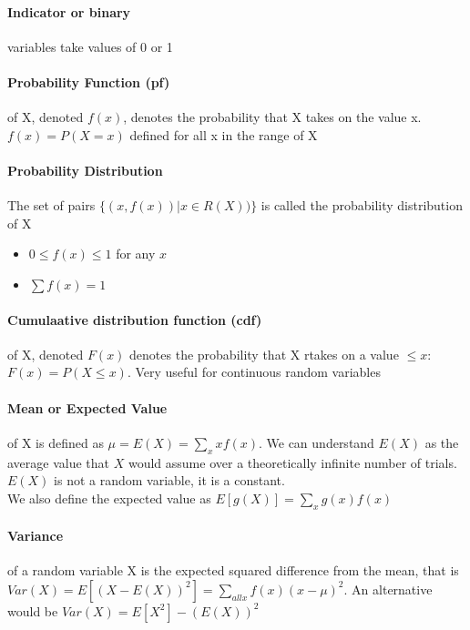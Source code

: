 \documentclass[12pt]{report}
\begin{document}
    \paragraph{Indicator or binary} variables take values of 0 or 1

    \paragraph{Probability Function (pf)} of X, denoted $f(x)$, denotes the
    probability that X takes on the value x. $f(x) = P(X = x)$ defined for all
    x in the range of X

    \paragraph{Probability Distribution} The set of pairs $\{(x, f(x)) | x \in
    R(X))\}$ is called the probability distribution of X
    \begin{itemize}
      \item $0 \leq f(x) \leq 1$ for any $x$
      \item $\sum f(x) = 1$
    \end{itemize}

    \paragraph{Cumulaative distribution function (cdf)} of X, denoted $F(x)$
    denotes the probability that X rtakes on a value $\leq x$: $F(x) = P(X
    \leq x)$. Very useful for continuous random variables

    \paragraph{Mean or Expected Value} of X is defined as $\mu = E(X) = \sum_x
    xf(x)$. We can understand $E(X)$ as the average value that $X$ would assume
    over a theoretically infinite number of trials. $E(X)$ is not a random
    variable, it is a constant.\\
    We also define the expected value as $E[g(X)] = \sum_x g(x)f(x)$

    \paragraph{Variance} of a random variable X is the expected squared
    difference from the mean, that is $Var(X) = E[(X - E(X))^2] = \sum_{all x}
    f(x)(x-\mu)^2$. An alternative would be $Var(X) = E[X^2] - (E(X))^2$
\end{document}
